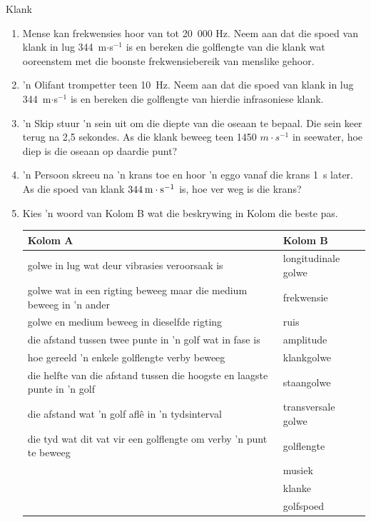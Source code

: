 \begin{eocexercises}{Klank}
\begin{enumerate}[noitemsep, label=\textbf{\arabic*}. ]
\item Mense kan frekwensies hoor van tot 20~000 Hz. Neem aan dat die spoed van klank in lug 344~m$\ensuremath{\cdot}$s${}^{-1}$ is en bereken die golflengte van die klank wat ooreenstem met die boonste frekwensiebereik van menslike gehoor.

\item  'n Olifant trompetter teen 10~Hz. Neem aan dat die spoed van klank in lug 344~m$\ensuremath{\cdot}$s${}^{-1}$ is en bereken die golflengte van hierdie infrasoniese klank.

\item  'n Skip stuur  'n sein uit om die diepte van die oseaan te bepaal. Die sein keer terug na 2,5 sekondes. As die klank beweeg teen 1450 $m\cdot s^{-1}$ in seewater, hoe diep is die oseaan op daardie punt?

\item  'n Persoon skreeu na  'n krans toe en hoor  'n eggo vanaf die krans 1~s later. As die spoed van klank $344\phantom{\rule{2pt}{0ex}}\text{m}\ensuremath{\cdot}\text{s}{}^{-1}$ is, hoe ver weg is die krans?

\item Kies  'n woord van Kolom B wat die beskrywing in Kolom die beste pas.
\begin{center}
\begin{tabular}{ll}
\textbf{Kolom A} & \textbf{Kolom B} \\ \hline
golwe in lug wat deur vibrasies veroorsaak is & longitudinale golwe \\
golwe wat in een rigting beweeg maar die medium beweeg in  'n ander & frekwensie \\
golwe en medium beweeg in dieselfde rigting  & ruis \\
die afstand tussen twee punte in  'n golf wat in fase is & amplitude \\
hoe gereeld  'n enkele golflengte verby beweeg & klankgolwe \\
die helfte van die afstand tussen die hoogste en laagste punte in  'n golf & staangolwe \\
die afstand wat  'n golf afl\^e in  'n tydsinterval & transversale golwe \\
die tyd wat dit vat vir een golflengte om verby  'n punt te beweeg & golflengte \\
& musiek \\
& klanke \\
& golfspoed \\
\end{tabular}
\end{center}
\end{enumerate}
  \label{m38800**end}
  \label{9b5d72dd5f0585e544578ab90a9956a8**end}
\end{eocexercises}
